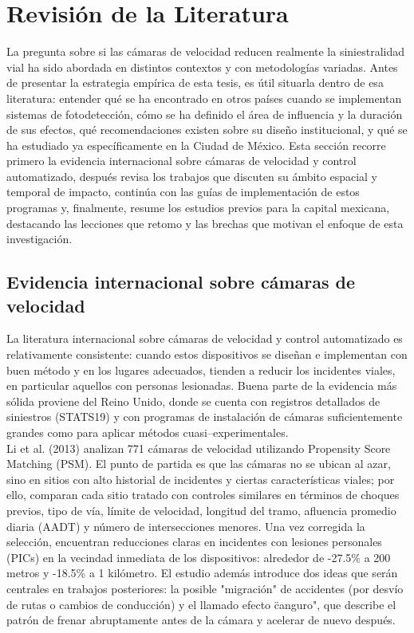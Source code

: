\chapter{Revisión de la Literatura}

\noindent La pregunta sobre si las cámaras de velocidad reducen realmente la siniestralidad vial ha sido abordada en distintos contextos y con metodologías variadas. Antes de presentar la estrategia empírica de esta tesis, es útil situarla dentro de esa literatura: entender qué se ha encontrado en otros países cuando se implementan sistemas de fotodetección, cómo se ha definido el área de influencia y la duración de sus efectos, qué recomendaciones existen sobre su diseño institucional, y qué se ha estudiado ya específicamente en la Ciudad de México. Esta sección recorre primero la evidencia internacional sobre cámaras de velocidad y control automatizado, después revisa los trabajos que discuten su ámbito espacial y temporal de impacto, continúa con las guías de implementación de estos programas y, finalmente, resume los estudios previos para la capital mexicana, destacando las lecciones que retomo y las brechas que motivan el enfoque de esta investigación.

\section{Evidencia internacional sobre cámaras de velocidad}

\noindent La literatura internacional sobre cámaras de velocidad y control automatizado es relativamente consistente: cuando estos dispositivos se diseñan e implementan con buen método y en los lugares adecuados, tienden a reducir los incidentes viales, en particular aquellos con personas lesionadas. Buena parte de la evidencia más sólida proviene del Reino Unido, donde se cuenta con registros detallados de siniestros (STATS19) y con programas de instalación de cámaras suficientemente grandes como para aplicar métodos cuasi–experimentales.\\

Li et al. (2013) analizan 771 cámaras de velocidad utilizando Propensity Score Matching (PSM). El punto de partida es que las cámaras no se ubican al azar, sino en sitios con alto historial de incidentes y ciertas características viales; por ello, comparan cada sitio tratado con controles similares en términos de choques previos, tipo de vía, límite de velocidad, longitud del tramo, afluencia promedio diaria (AADT) y número de intersecciones menores. Una vez corregida la selección, encuentran reducciones claras en incidentes con lesiones personales (PICs) en la vecindad inmediata de los dispositivos: alrededor de -27.5\% a 200 metros y -18.5\% a 1 kilómetro. El estudio además introduce dos ideas que serán centrales en trabajos posteriores: la posible "migración" de accidentes (por desvío de rutas o cambios de conducción) y el llamado efecto \"canguro", que describe el patrón de frenar abruptamente antes de la cámara y acelerar de nuevo después.\\ 

